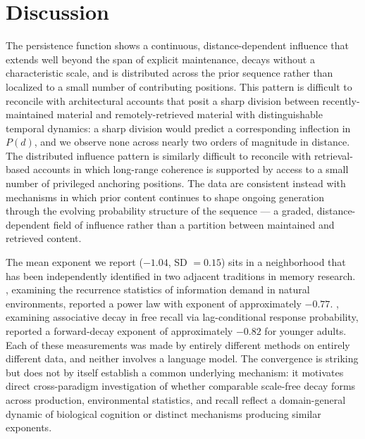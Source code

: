\documentclass[11pt]{article}
\begin{document}
\section{Discussion}

The persistence function shows a continuous, distance-dependent influence that extends
well beyond the span of explicit maintenance, decays without a characteristic scale, and
is distributed across the prior sequence rather than localized to a small number of
contributing positions. This pattern is difficult to reconcile with architectural
accounts that posit a sharp division between recently-maintained material and
remotely-retrieved material with distinguishable temporal dynamics: a sharp division
would predict a corresponding inflection in $P(d)$, and we observe none across nearly two
orders of magnitude in distance. The distributed influence pattern is similarly difficult
to reconcile with retrieval-based accounts in which long-range coherence is supported by
access to a small number of privileged anchoring positions. The data are consistent
instead with mechanisms in which prior content continues to shape ongoing generation
through the evolving probability structure of the sequence --- a graded, distance-dependent
field of influence rather than a partition between maintained and retrieved content.

The mean exponent we report ($-1.04$, SD $=0.15$) sits in a neighborhood that has been
independently identified in two adjacent traditions in memory research.
\citet{anderson1991reflections}, examining the recurrence statistics of information demand
in natural environments, reported a power law with exponent of approximately $-0.77$.
\citet{kahana2002age}, examining associative decay in free recall via lag-conditional
response probability, reported a forward-decay exponent of approximately $-0.82$ for
younger adults. Each of these measurements was made by entirely different methods on
entirely different data, and neither involves a language model. The convergence is striking
but does not by itself establish a common underlying mechanism: it motivates direct
cross-paradigm investigation of whether comparable scale-free decay forms across production,
environmental statistics, and recall reflect a domain-general dynamic of biological cognition
or distinct mechanisms producing similar exponents.
\end{document}

